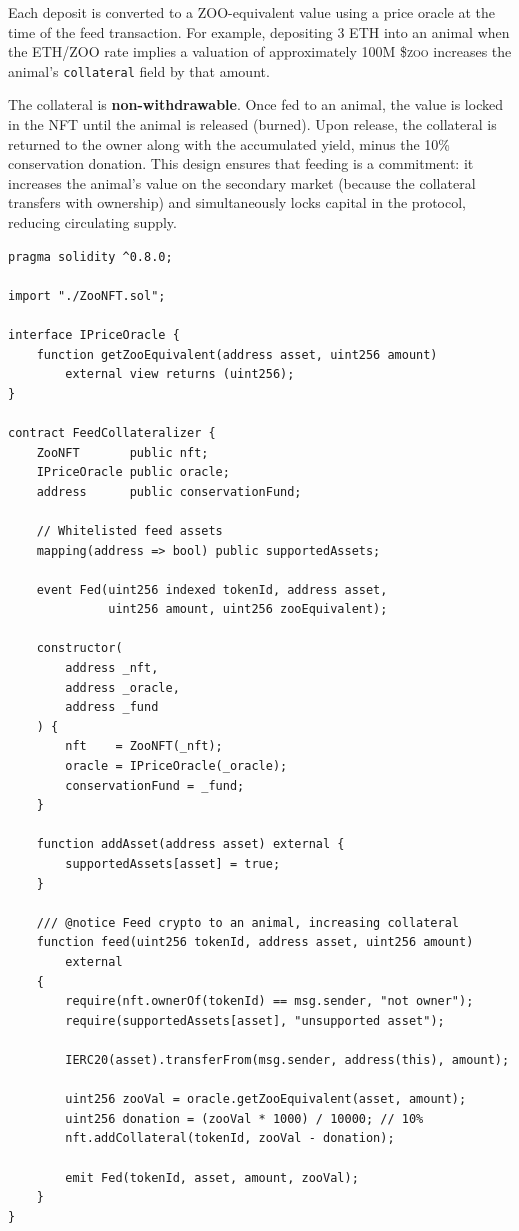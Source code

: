 \documentclass[11pt,letterpaper]{article}
\newcommand{\ZOO}{\$\textsc{zoo}}
\begin{document}
Each deposit is converted to a ZOO-equivalent value using a price oracle at the time of
the feed transaction.  For example, depositing 3 ETH into an animal when the ETH/ZOO
rate implies a valuation of approximately 100M \ZOO{} increases the animal's
\texttt{collateral} field by that amount.

The collateral is \textbf{non-withdrawable}.  Once fed to an animal, the value is locked
in the NFT until the animal is released (burned).  Upon release, the collateral is returned
to the owner along with the accumulated yield, minus the 10\% conservation donation.  This
design ensures that feeding is a commitment: it increases the animal's value on the secondary
market (because the collateral transfers with ownership) and simultaneously locks capital in
the protocol, reducing circulating supply.

\begin{lstlisting}[language=Solidity,caption={FeedCollateralizer: multi-asset intake and valuation}]
pragma solidity ^0.8.0;

import "./ZooNFT.sol";

interface IPriceOracle {
    function getZooEquivalent(address asset, uint256 amount)
        external view returns (uint256);
}

contract FeedCollateralizer {
    ZooNFT       public nft;
    IPriceOracle public oracle;
    address      public conservationFund;

    // Whitelisted feed assets
    mapping(address => bool) public supportedAssets;

    event Fed(uint256 indexed tokenId, address asset,
              uint256 amount, uint256 zooEquivalent);

    constructor(
        address _nft,
        address _oracle,
        address _fund
    ) {
        nft    = ZooNFT(_nft);
        oracle = IPriceOracle(_oracle);
        conservationFund = _fund;
    }

    function addAsset(address asset) external {
        supportedAssets[asset] = true;
    }

    /// @notice Feed crypto to an animal, increasing collateral
    function feed(uint256 tokenId, address asset, uint256 amount)
        external
    {
        require(nft.ownerOf(tokenId) == msg.sender, "not owner");
        require(supportedAssets[asset], "unsupported asset");

        IERC20(asset).transferFrom(msg.sender, address(this), amount);

        uint256 zooVal = oracle.getZooEquivalent(asset, amount);
        uint256 donation = (zooVal * 1000) / 10000; // 10%
        nft.addCollateral(tokenId, zooVal - donation);

        emit Fed(tokenId, asset, amount, zooVal);
    }
}
\end{lstlisting}
\end{document}
